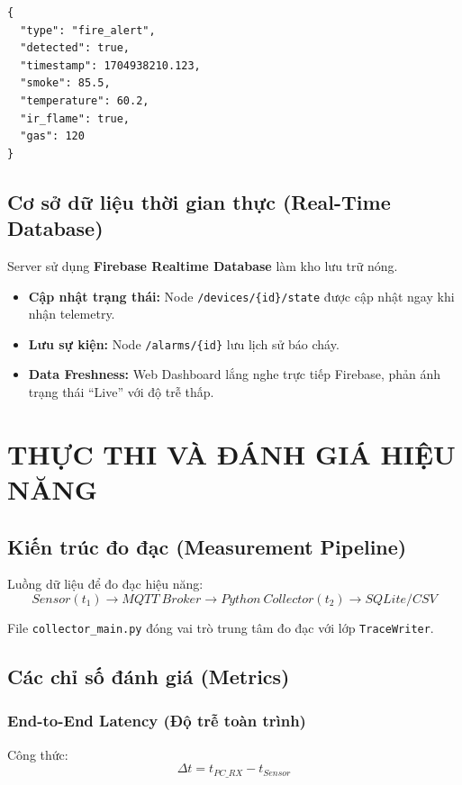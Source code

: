 \documentclass[12pt,a4paper]{report}
\begin{document}
\begin{lstlisting}[caption={Cấu trúc gói tin Alert JSON}]
{
  "type": "fire_alert",
  "detected": true,
  "timestamp": 1704938210.123,
  "smoke": 85.5,
  "temperature": 60.2,
  "ir_flame": true,
  "gas": 120
}
\end{lstlisting}

\section{Cơ sở dữ liệu thời gian thực (Real-Time Database)}
Server sử dụng \textbf{Firebase Realtime Database} làm kho lưu trữ nóng.
\begin{itemize}
    \item \textbf{Cập nhật trạng thái:} Node \texttt{/devices/\{id\}/state} được cập nhật ngay khi nhận telemetry.
    \item \textbf{Lưu sự kiện:} Node \texttt{/alarms/\{id\}} lưu lịch sử báo cháy.
    \item \textbf{Data Freshness:} Web Dashboard lắng nghe trực tiếp Firebase, phản ánh trạng thái ``Live'' với độ trễ thấp.
\end{itemize}

\chapter{THỰC THI VÀ ĐÁNH GIÁ HIỆU NĂNG}

\section{Kiến trúc đo đạc (Measurement Pipeline)}
Luồng dữ liệu để đo đạc hiệu năng:
\[ Sensor (t_1) \rightarrow MQTT\ Broker \rightarrow Python\ Collector (t_2) \rightarrow SQLite/CSV \]

File \texttt{collector\_main.py} đóng vai trò trung tâm đo đạc với lớp \texttt{TraceWriter}.

\section{Các chỉ số đánh giá (Metrics)}

\subsection{End-to-End Latency (Độ trễ toàn trình)}
Công thức:
\[ \Delta t = t_{PC\_RX} - t_{Sensor} \]
\end{document}
